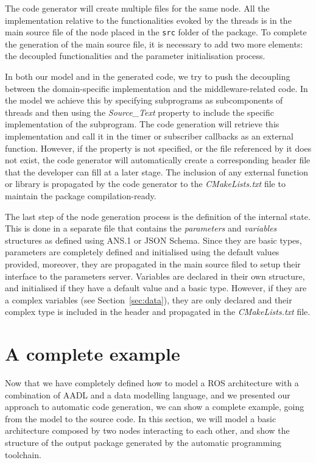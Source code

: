 The code generator will create multiple files for the same node. All the implementation relative to the functionalities evoked by the threads is in the main source file of the node placed in the \texttt{src} folder of the package. To complete the generation of the main source file, it is necessary to add two more elements: the decoupled functionalities and the parameter initialisation process.

In both our model and in the generated code, we try to push the decoupling between the domain-specific implementation and the middleware-related code. In the model we achieve this by specifying subprograms as subcomponents of threads and then using the \textit{Source\_Text} property to include the specific implementation of the subprogram. The code generation will retrieve this implementation and call it in the timer or subscriber callbacks as an external function. However, if the property is not specified, or the file referenced by it does not exist, the code generator will automatically create a corresponding header file that the developer can fill at a later stage. The inclusion of any external function or library is propagated by the code generator to the \textit{CMakeLists.txt} file to maintain the package compilation-ready.

The last step of the node generation process is the definition of the internal state. This is done in a separate file that contains the \textit{parameters} and \textit{variables} structures as defined using ANS.1 or JSON Schema. Since they are basic types, parameters are completely defined and initialised using the default values provided, moreover, they are propagated in the main source filed to setup their interface to the parameters server. Variables are declared in their own structure, and initialised if they have a default value and a basic type. However, if they are a complex variables (see Section~\ref{sec:data}), they are only declared and their complex type is included in the header and propagated in the \textit{CMakeLists.txt} file.

\section{A complete example}
Now that we have completely defined how to model a ROS architecture with a combination of AADL and a data modelling language, and we presented our approach to automatic code generation, we can show a complete example, going from the model to the source code. In this section, we will model a basic architecture composed by two nodes interacting to each other, and show the structure of the output package generated by the automatic programming toolchain.


